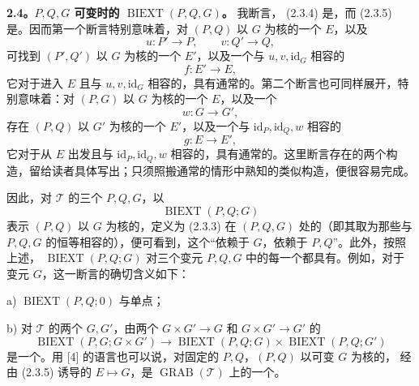 \textbf{2.4。$P,Q,G$ 可变时的 $\operatorname{BIEXT}(P,Q,G)$。} 我断言， (2.3.4) 是，而 (2.3.5) 是。因而第一个断言特别意味着，对 $(P,Q)$ 以 $G$ 为核的一个 $E$，以及
\[
u:P'\longrightarrow P,\qquad v:Q'\longrightarrow Q,
\]
可找到 $(P',Q')$ 以 $G$ 为核的一个 $E'$，以及一个与 $u,v,\mathrm{id}_G$ 相容的
\[
f:E'\longrightarrow E,
\]
它对于进入 $E$ 且与 $u,v,\mathrm{id}_G$ 相容的，具有通常的。第二个断言也可同样展开，特别意味着：对 $(P,G)$ 以 $G$ 为核的一个 $E$，以及一个
\[
w:G\longrightarrow G',
\]
存在 $(P,Q)$ 以 $G'$ 为核的一个 $E'$，以及一个与 $\mathrm{id}_P,\mathrm{id}_Q,w$ 相容的
\[
g:E\longrightarrow E',
\]
它对于从 $E$ 出发且与 $\mathrm{id}_P,\mathrm{id}_Q,w$ 相容的，具有通常的。这里断言存在的两个构造，留给读者具体写出；只须照搬通常的情形中熟知的类似构造，便很容易完成。

因此，对 $\mathcal T$ 的三个 $P,Q,G$，以
\[
\operatorname{BIEXT}(P,Q;G)\tag{2.4.1}
\]
表示 $(P,Q)$ 以 $G$ 为核的，定义为 (2.3.3) 在 $(P,Q,G)$ 处的（即其取为那些与 $P,Q,G$ 的恒等相容的），便可看到，这个“依赖于 $G$，依赖于 $P,Q$”。此外，按照上述， $\operatorname{BIEXT}(P,Q;G)$ 对三个变元 $P,Q,G$ 中的每一个都具有。例如，对于变元 $G$，这一断言的确切含义如下：

 a) $\operatorname{BIEXT}(P,Q;0)$ 与单点；

 b) 对 $\mathcal T$ 的两个 $G,G'$，由两个 $G\times G'\to G$ 和 $G\times G'\to G'$ 的
\[
\operatorname{BIEXT}(P,G;G\times G')\longrightarrow
\operatorname{BIEXT}(P,Q;G)\times\operatorname{BIEXT}(P,Q;G')\tag{2.4.2}
\]
是一个。用 [4] 的语言也可以说，对固定的 $P,Q$，$(P,Q)$ 以可变 $G$ 为核的，
经由 (2.3.5) 诱导的 $E\mapsto G$，是 $\operatorname{GRAB}(\mathcal T)$ 上的一个。

